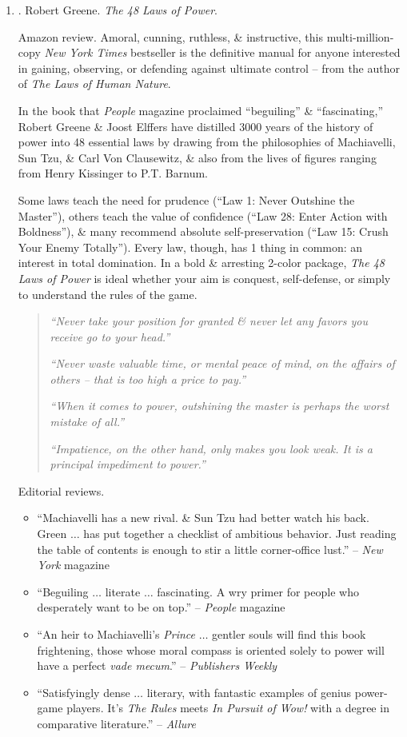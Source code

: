 \documentclass{article}
\begin{document}
\begin{enumerate}
	\item \cite{Greene_laws_power}. {\sc Robert Greene}. {\it The 48 Laws of Power}. {}
	
	{\sf Amazon review.} Amoral, cunning, ruthless, \& instructive, this multi-million-copy {\it New York Times} bestseller is the definitive manual for anyone interested in gaining, observing, or defending against ultimate control -- from the author of {\it The Laws of Human Nature}.
	
	In the book that {\it People} magazine proclaimed ``beguiling'' \& ``fascinating,'' {\sc Robert Greene} \& {\sc Joost Elffers} have distilled 3000 years of the history of power into 48 essential laws by drawing from the philosophies of {\sc Machiavelli, Sun Tzu}, \& {\sc Carl Von Clausewitz}, \& also from the lives of figures ranging from {\sc Henry Kissinger} to {\sc P.T. Barnum}.
	
	Some laws teach the need for prudence (``Law 1: Never Outshine the Master''), others teach the value of confidence (``Law 28: Enter Action with Boldness''), \& many recommend absolute self-preservation (``Law 15: Crush Your Enemy Totally''). Every law, though, has 1 thing in common: an interest in total domination. In a bold \& arresting 2-color package, {\it The 48 Laws of Power} is ideal whether your aim is conquest, self-defense, or simply to understand the rules of the game.
	\begin{quotation}
		{\it``Never take your position for granted \& never let any favors you receive go to your head.''}
		
		{\it``Never waste valuable time, or mental peace of mind, on the affairs of others -- that is too high a price to pay.''}
		
		{\it``When it comes to power, outshining the master is perhaps the worst mistake of all.''}
		
		{\it``Impatience, on the other hand, only makes you look weak. It is a principal impediment to power.''}
	\end{quotation}
	{\sf Editorial reviews.}
	\begin{itemize}
		\item ``{\sc Machiavelli} has a new rival. \& {\sc Sun Tzu} had better watch his back. {\sc Green} $\ldots$ has put together a checklist of ambitious behavior. Just reading the table of contents is enough to stir a little corner-office lust.'' -- {\it New York} magazine
		\item ``Beguiling $\ldots$ literate $\ldots$ fascinating. A wry primer for people who desperately want to be on top.'' -- {\it People} magazine
		\item ``An heir to {\sc Machiavelli}'s {\it Prince} $\ldots$ gentler souls will find this book frightening, those whose moral compass is oriented solely to power will have a perfect {\it vade mecum}.'' -- {\it Publishers Weekly}
		\item ``Satisfyingly dense $\ldots$ literary, with fantastic examples of genius power-game players. It's {\it The Rules} meets {\it In Pursuit of Wow!} with a degree in comparative literature.'' -- {\it Allure}
	\end{itemize}
	

\end{enumerate}
\end{document}
